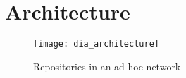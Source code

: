 \section{Architecture}

\begin{figure}[]
    \centering
    \texttt{[image: dia\_architecture]}
    \caption{Repositories in an ad-hoc network}
    \label{fig:dia_architecture}
\end{figure}

